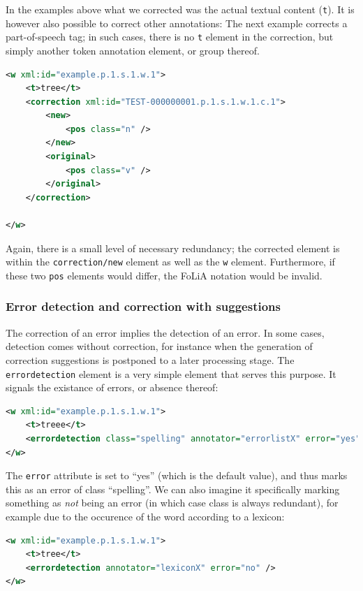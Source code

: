 \documentclass[a4paper,12pt]{report}
\begin{document}
In the examples above what we corrected was the actual textual content (\texttt{t}). It is however also possible to correct other annotations: The next example corrects a part-of-speech tag; in such cases, there is no \texttt{t} element in the correction, but simply another token annotation element, or group thereof.

\begin{lstlisting}[language=xml]
<w xml:id="example.p.1.s.1.w.1">
    <t>tree</t>
    <correction xml:id="TEST-000000001.p.1.s.1.w.1.c.1">
        <new>
            <pos class="n" />
        </new>
        <original>
            <pos class="v" />
        </original>
    </correction>
    
</w>    
\end{lstlisting}

Again, there is a small level of necessary redundancy; the corrected element is within the \texttt{correction/new} element as well as the \texttt{w} element. Furthermore, if these two \texttt{pos} elements would differ, the FoLiA notation would be invalid.

\subsubsection{Error detection and correction with suggestions} 

The correction of an error implies the detection of an error. In some cases, detection comes without correction, for instance when the generation of correction suggestions is postponed to a later processing stage. The \texttt{errordetection} element is a very simple element that serves this purpose. It signals the existance of errors, or absence thereof:

\begin{lstlisting}[language=xml]
<w xml:id="example.p.1.s.1.w.1">
    <t>treee</t>
    <errordetection class="spelling" annotator="errorlistX" error="yes" />
</w>    
\end{lstlisting}

The \texttt{error} attribute is set to ``yes'' (which is the default value), and thus marks this as an error of class ``spelling''. We can also imagine it specifically marking something as \emph{not} being an error (in which case class is always redundant), for example due to the occurence of the word according to a lexicon:

\begin{lstlisting}[language=xml]
<w xml:id="example.p.1.s.1.w.1">
    <t>tree</t>
    <errordetection annotator="lexiconX" error="no" />
</w>    
\end{lstlisting}
\end{document}
